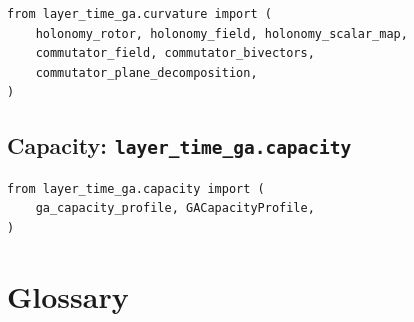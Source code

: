 \documentclass[11pt, twoside, openright]{memoir}
\numberwithin{equation}{chapter}
\begin{document}
\begin{lstlisting}
from layer_time_ga.curvature import (
    holonomy_rotor, holonomy_field, holonomy_scalar_map,
    commutator_field, commutator_bivectors,
    commutator_plane_decomposition,
)
\end{lstlisting}

\section{Capacity: \texttt{layer\_time\_ga.capacity}}

\begin{lstlisting}
from layer_time_ga.capacity import (
    ga_capacity_profile, GACapacityProfile,
)
\end{lstlisting}



\backmatter

\chapter*{Glossary}
\end{document}
